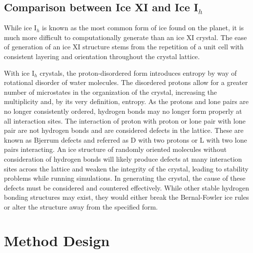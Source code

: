 \subsection{Comparison between Ice XI and Ice I$_{h}$}

While ice I$_{h}$ is known as the most common form of ice found on the planet, it is much more difficult to computationally generate than an ice XI crystal. 
The ease of generation of an ice XI structure stems from the repetition of a unit cell with consistent layering and orientation throughout the crystal lattice. 


With ice I$_{h}$ crystals, the proton-disordered form introduces entropy by way of rotational disorder of water molecules. 
The disordered protons allow for a greater number of microstates in the organization of the crystal, increasing the multiplicity and, by its very definition, entropy.
As the protons and lone pairs are no longer consistently ordered, hydrogen bonds may no longer form properly at all interaction sites. 
The interaction of proton with proton or lone pair with lone pair are not hydrogen bonds and are considered defects in the lattice. 
These are known as Bjerrum defects and referred as D with two protons or L with two lone pairs interacting.\cite{BjerrumDefects}
An ice structure of randomly oriented molecules without consideration of hydrogen bonds will likely produce defects at many interaction sites across the lattice and weaken the integrity of the crystal, leading to stability problems while running simulations. 
In generating the crystal, the cause of these defects must be considered and countered effectively.
While other stable hydrogen bonding structures may exist, they would either break the Bernal-Fowler ice rules or alter the structure away from the specified form.



\section{Method Design}


